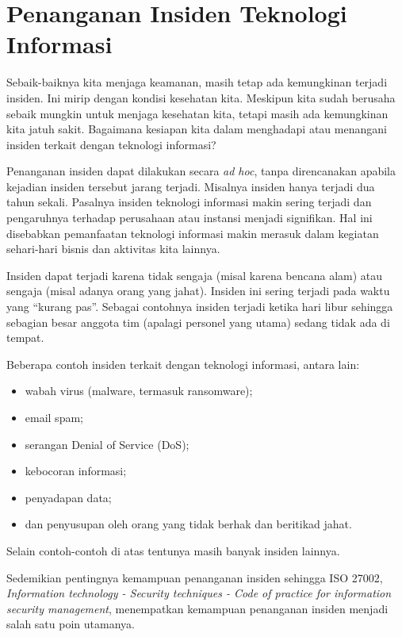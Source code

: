 \chapter{Penanganan Insiden Teknologi Informasi}
Sebaik-baiknya kita menjaga keamanan, masih tetap ada kemungkinan terjadi
insiden. Ini mirip dengan kondisi kesehatan kita. Meskipun kita sudah berusaha
sebaik mungkin untuk menjaga kesehatan kita, tetapi masih ada kemungkinan kita
jatuh sakit. Bagaimana kesiapan kita dalam menghadapi atau menangani insiden
terkait dengan teknologi informasi? 

Penanganan insiden dapat dilakukan secara {\em ad hoc}, tanpa direncanakan
apabila kejadian insiden tersebut jarang terjadi. Misalnya insiden hanya
terjadi dua tahun sekali. Pasalnya insiden teknologi informasi makin sering
terjadi dan pengaruhnya terhadap perusahaan atau instansi menjadi signifikan.
Hal ini disebabkan pemanfaatan teknologi informasi makin merasuk dalam kegiatan
sehari-hari bisnis dan aktivitas kita lainnya.

Insiden dapat terjadi karena tidak sengaja (misal karena bencana
alam) atau sengaja (misal adanya orang yang jahat).
Insiden ini sering terjadi pada waktu yang ``kurang pas''.
Sebagai contohnya insiden terjadi ketika hari libur sehingga sebagian
besar anggota tim (apalagi personel yang utama) sedang tidak ada
di tempat.

Beberapa contoh insiden terkait dengan teknologi informasi,
antara lain:
\begin{itemize}
\item wabah virus (malware, termasuk ransomware);
\item email spam;
\item serangan Denial of Service (DoS);
\item kebocoran informasi;
\item penyadapan data;
\item dan penyusupan oleh orang yang tidak berhak dan beritikad jahat.
\end{itemize}
Selain contoh-contoh di  atas tentunya masih banyak insiden lainnya.

Sedemikian pentingnya kemampuan penanganan insiden sehingga ISO 27002,
{\em Information technology - Security techniques - Code of practice
for information security management},
menempatkan kemampuan penanganan insiden menjadi salah satu poin utamanya.

